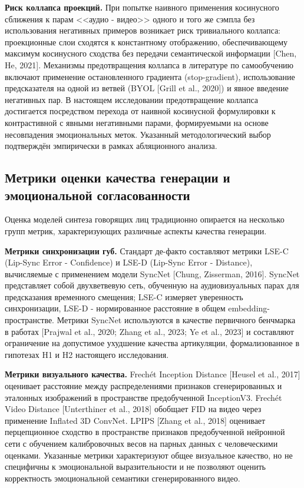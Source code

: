 \documentclass[a4paper, 12pt, oneside, openany]{article}
\begin{document}
\textbf{Риск коллапса проекций.} При попытке наивного применения косинусного сближения к парам <<аудио - видео>> одного и того же сэмпла без использования негативных примеров возникает риск тривиального коллапса: проекционные слои сходятся к константному отображению, обеспечивающему максимум косинусного сходства без передачи семантической информации [Chen, He, 2021]. Механизмы предотвращения коллапса в литературе по самообучению включают применение остановленного градиента (stop-gradient), использование предсказателя на одной из ветвей (BYOL [Grill et al., 2020]) и явное введение негативных пар. В настоящем исследовании предотвращение коллапса достигается посредством перехода от наивной косинусной формулировки к контрастивной с явными негативными парами, формируемыми на основе несовпадения эмоциональных меток. Указанный методологический выбор подтверждён эмпирически в рамках абляционного анализа.

\subsection{Метрики оценки качества генерации и эмоциональной согласованности}

Оценка моделей синтеза говорящих лиц традиционно опирается на несколько групп метрик, характеризующих различные аспекты качества генерации.

\textbf{Метрики синхронизации губ.} Стандарт де-факто составляют метрики LSE-C (Lip-Sync Error - Confidence) и LSE-D (Lip-Sync Error - Distance), вычисляемые с применением модели SyncNet [Chung, Zisserman, 2016]. SyncNet представляет собой двухветвевую сеть, обученную на аудиовизуальных парах для предсказания временного смещения; LSE-C измеряет уверенность синхронизации, LSE-D - нормированное расстояние в общем embedding-пространстве. Метрики SyncNet используются в качестве первичного бенчмарка в работах [Prajwal et al., 2020; Zhang et al., 2023; Ye et al., 2023] и составляют ограничение на допустимое ухудшение качества артикуляции, формализованное в гипотезах H1 и H2 настоящего исследования.

\textbf{Метрики визуального качества.} Frechét Inception Distance [Heusel et al., 2017] оценивает расстояние между распределениями признаков сгенерированных и эталонных изображений в пространстве предобученной InceptionV3. Frechét Video Distance [Unterthiner et al., 2018] обобщает FID на видео через применение Inflated 3D ConvNet. LPIPS [Zhang et al., 2018] оценивает перцепционное сходство в пространстве признаков предобученной нейронной сети с обучением калибровочных весов на парных данных с человеческими оценками. Указанные метрики характеризуют общее визуальное качество, но не специфичны к эмоциональной выразительности и не позволяют оценить корректность эмоциональной семантики сгенерированного видео.
\end{document}
